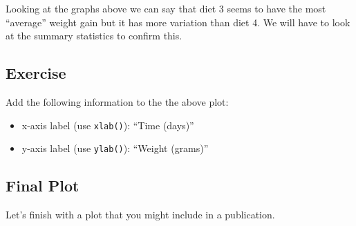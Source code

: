 \documentclass[a4paper,9pt,twocolumn,twoside,printwatermark=false]{pinp}
\providecommand{\tightlist}{%
  \setlength{\itemsep}{0pt}\setlength{\parskip}{0pt}}
\begin{document}
Looking at the graphs above we can say that diet 3 seems to have the
most ``average'' weight gain but it has more variation than diet 4. We
will have to look at the summary statistics to confirm this.

\subsection{Exercise}\label{exercise-6}

Add the following information to the the above plot:

\begin{itemize}
\tightlist
\item
  x-axis label (use \texttt{xlab()}): ``Time (days)''
\item
  y-axis label (use \texttt{ylab()}): ``Weight (grams)''
\end{itemize}

\subsection{Final Plot}\label{final-plot}

Let's finish with a plot that you might include in a publication.

\begin{Shaded}
\begin{Highlighting}[]
                             \OperatorTok{+}
\StringTok{  }\NormalTok{(}\OperatorTok{~}\OperatorTok{+}
\StringTok{  }\NormalTok{() }\OperatorTok{+}
\StringTok{  }\NormalTok{(}\NormalTok{, }\NormalTok{,}
               \NormalTok{) }\OperatorTok{+}
\StringTok{  }\NormalTok{(} \NormalTok{) }\OperatorTok{+}
\StringTok{  }\NormalTok{(}\NormalTok{) }\OperatorTok{+}\StringTok{ }
\StringTok{  }\NormalTok{(}\NormalTok{) }\OperatorTok{+}
\StringTok{  }\NormalTok{(}\NormalTok{)}
\end{Highlighting}
\end{Shaded}
\end{document}
